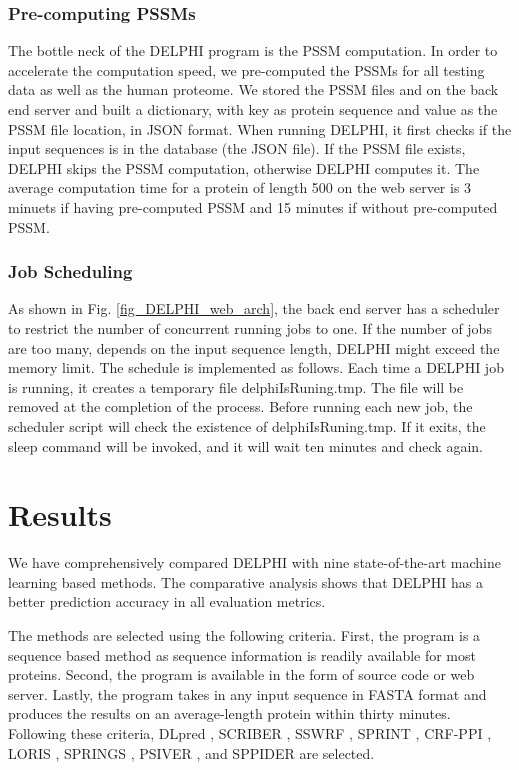 \subsubsection{Pre-computing PSSMs}
The bottle neck of the DELPHI program is the PSSM computation. In order to accelerate the computation speed, we pre-computed the PSSMs for all testing data as well as the human proteome. We stored the PSSM files and on the back end server and built a dictionary, with key as protein sequence and value as the PSSM file location, in JSON format. When running DELPHI, it first checks if the input sequences is in the database (the JSON file). If the PSSM file exists, DELPHI skips the PSSM computation, otherwise DELPHI computes it. The average computation time for a protein of length 500 on the web server is 3 minuets if having pre-computed PSSM and 15 minutes if without pre-computed PSSM.

\subsubsection{Job Scheduling}
As shown in Fig. \ref{fig_DELPHI_web_arch}, the back end server has a scheduler to restrict the number of concurrent running jobs to one. If the number of jobs are too many, depends on the input sequence length, DELPHI might exceed the memory limit. The schedule is implemented as follows. Each time a DELPHI job is running, it creates a temporary file delphiIsRuning.tmp. The file will be removed at the completion of the process. Before running each new job, the scheduler script will check the existence of delphiIsRuning.tmp. If it exits, the sleep command will be invoked, and it will wait ten minutes and check again.



\section{Results}
We have comprehensively compared DELPHI with nine state-of-the-art machine learning based methods. The comparative analysis shows that DELPHI has a better prediction accuracy in all evaluation metrics. 

The methods are selected using the following criteria. First, the program is a sequence based method as sequence information is readily available for most proteins. Second, the program is available in the form of source code or web server. Lastly, the program takes in any input sequence in FASTA format and produces the results on an average-length protein within thirty minutes. Following these criteria, DLpred \cite{zhang2019sequence}, SCRIBER \cite{zhang2019scriber}, SSWRF \cite{wei2016protein}, SPRINT \cite{taherzadeh2016sequence}, CRF-PPI \cite{wei2015cascade}, LORIS \cite{dhole2014sequence}, SPRINGS \cite{singh2014springs}, PSIVER \cite{murakami2010applying}, and SPPIDER \cite{porollo2007prediction} are selected.

